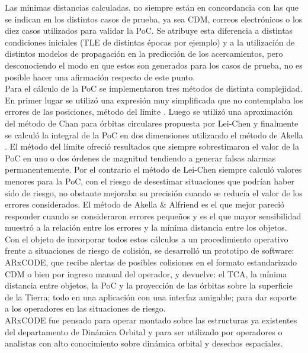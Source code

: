Las m\'inimas distancias calculadas, no siempre est\'an en concordancia con las que se indican en los distintos casos de prueba, ya sea CDM, correos electr\'onicos o los diez casos utilizados para validar la PoC. Se atribuye esta diferencia a distintas condiciones iniciales (TLE de distintas \'epocas por ejemplo) y a la utilizaci\'on de distintos modelos de propagaci\'on en la predicci\'on de los acercamientos, pero desconociendo el modo en que estos son generados para los casos de prueba, no es posible hacer una afirmaci\'on respecto de este punto.\\ 

Para el c\'alculo de la PoC se implementaron tres m\'etodos de distinta complejidad. En primer lugar se utiliz\'o una expresi\'on muy simplificada que no contemplaba los errores de las posiciones, m\'etodo del l\'imite  \citep{alfano2008method}. Luego se utiliz\'o una aproximaci\'on del m\'etodo de Chan \citep{chan2003improved} para \'orbitas circulares propuesta por Lei-Chen \citep{leichen} y finalmente se calcul\'o la integral de la PoC en dos dimensiones utilizando el m\'etodo de Akella \citep{akellaAlfriend}. El m\'etodo del l\'imite ofreci\'o resultados que siempre sobrestimaron el valor de la PoC en uno o dos \'ordenes de magnitud tendiendo a generar falsas alarmas permanentemente. Por el contrario el m\'etodo de Lei-Chen siempre calcul\'o valores menores para la PoC, con el riesgo de desestimar situaciones que podr\'ian haber sido  de riesgo, no obstante mejoraba su precisi\'on cuando se reduc\'ia el valor de los errores considerados. El m\'etodo de Akella \& Alfriend es el que mejor pareci\'o responder cuando se consideraron errores peque\~nos y es el que mayor sensibilidad muestr\'o a la relaci\'on entre los errores y la m\'inima distancia entre los objetos.\\

Con el objeto de incorporar todos estos c\'alculos a un procedimiento operativo frente a situaciones de riesgo de colisi\'on, se desarroll\'o un prototipo de software: ARxCODE, que recibe alertas de posibles colisiones en el formato estandarizado CDM o bien por ingreso manual del operador, y devuelve: el TCA, la m\'inima distancia entre objetos, la PoC y la proyecci\'on de las \'orbitas sobre la superficie de la Tierra; todo en una aplicaci\'on con una interfaz amigable; para dar soporte a los operadores en las situaciones de riesgo.\\

ARxCODE fue pensado para operar montado sobre las estructuras ya existentes del departamento de Din\'amica Orbital y para ser utilizado por operadores o analistas con alto conocimiento sobre din\'amica orbital y desechos espaciales.\\

